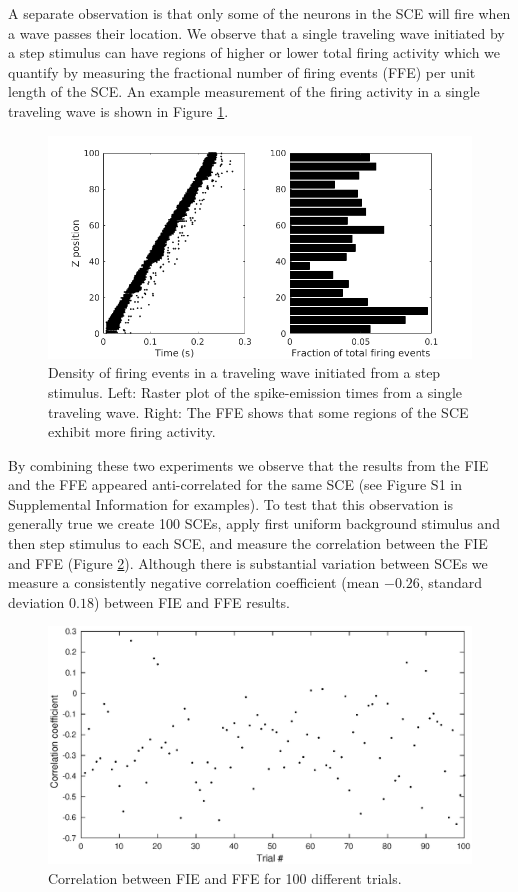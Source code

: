 \documentclass[12pt]{article}
\begin{document}
A separate observation is that only some of the neurons in the SCE will fire when a wave passes their location.
We observe that a single traveling wave initiated by a step stimulus can have regions of higher or lower total firing activity which we quantify by measuring the fractional number of firing events (FFE) per unit length of the SCE.
An example measurement of the firing activity in a single traveling wave is shown in Figure \ref{fig:wave_density}.
\begin{figure}[!htb]
 \caption{Density of firing events in a traveling wave initiated from a step stimulus. Left: Raster plot of the spike-emission times from a single traveling wave. Right: The FFE shows that some regions of the SCE exhibit more firing activity.}
 \label{fig:wave_density}
 \centering
   \includegraphics[width=\textwidth]{fig/ImpulseWaveDensity}
\end{figure}

By combining these two experiments we observe that the results from the FIE and the FFE appeared anti-correlated for the same SCE (see Figure S1 in Supplemental Information for examples).
To test that this observation is generally true we create 100 SCEs, apply first uniform background stimulus and then step stimulus to each SCE, and measure the correlation between the FIE and FFE (Figure \ref{fig:InitiationCorrelation}).
Although there is substantial variation between SCEs we measure a consistently negative correlation coefficient (mean $-0.26$, standard deviation $0.18$) between FIE and FFE results.
\begin{figure}[!htb]
 \centering
 \caption{Correlation between FIE and FFE for 100 different trials. }
 \label{fig:InitiationCorrelation}
 \includegraphics[width=\textwidth]{fig/InitiationCorrelation.eps}
\end{figure}
\end{document}

